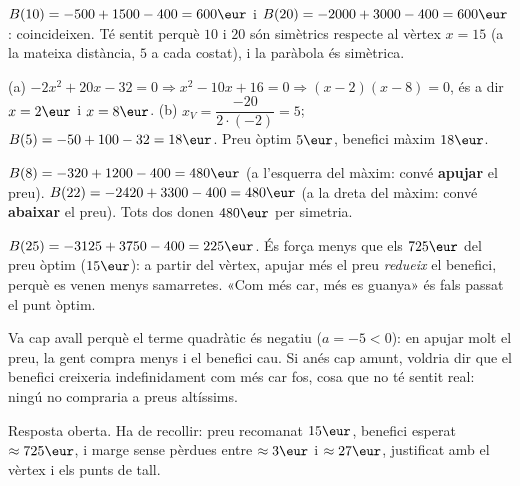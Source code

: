 \begin{solucions}
\begin{sollist}
  \item $B(10)=-500+1500-400=600\eur$ i $B(20)=-2000+3000-400=600\eur$: coincideixen.
        Té sentit perquè $10$ i $20$ són simètrics respecte al vèrtex $x=15$ (a la
        mateixa distància, $5$ a cada costat), i la paràbola és simètrica.
  \item (a) $-2x^2+20x-32=0 \Rightarrow x^2-10x+16=0 \Rightarrow (x-2)(x-8)=0$, és a
        dir $x=2\eur$ i $x=8\eur$. \quad (b) $x_V=\dfrac{-20}{2\cdot(-2)}=5$;
        $B(5)=-50+100-32=18\eur$. Preu òptim $5\eur$, benefici màxim $18\eur$.
  \item $B(8)=-320+1200-400=480\eur$ (a l'esquerra del màxim: convé \textbf{apujar} el
        preu). $B(22)=-2420+3300-400=480\eur$ (a la dreta del màxim: convé
        \textbf{abaixar} el preu). Tots dos donen $480\eur$ per simetria.
  \item $B(25)=-3125+3750-400=225\eur$. És força menys que els $725\eur$ del preu
        òptim ($15\eur$): a partir del vèrtex, apujar més el preu \emph{redueix} el
        benefici, perquè es venen menys samarretes. «Com més car, més es guanya» és
        fals passat el punt òptim.
  \item Va cap avall perquè el terme quadràtic és negatiu ($a=-5<0$): en apujar molt el
        preu, la gent compra menys i el benefici cau. Si anés cap amunt, voldria dir que
        el benefici creixeria indefinidament com més car fos, cosa que no té sentit real:
        ningú no compraria a preus altíssims.
  \item Resposta oberta. Ha de recollir: preu recomanat $15\eur$, benefici esperat
        $\approx 725\eur$, i marge sense pèrdues entre $\approx 3\eur$ i $\approx 27\eur$,
        justificat amb el vèrtex i els punts de tall.
\end{sollist}
\end{solucions}

